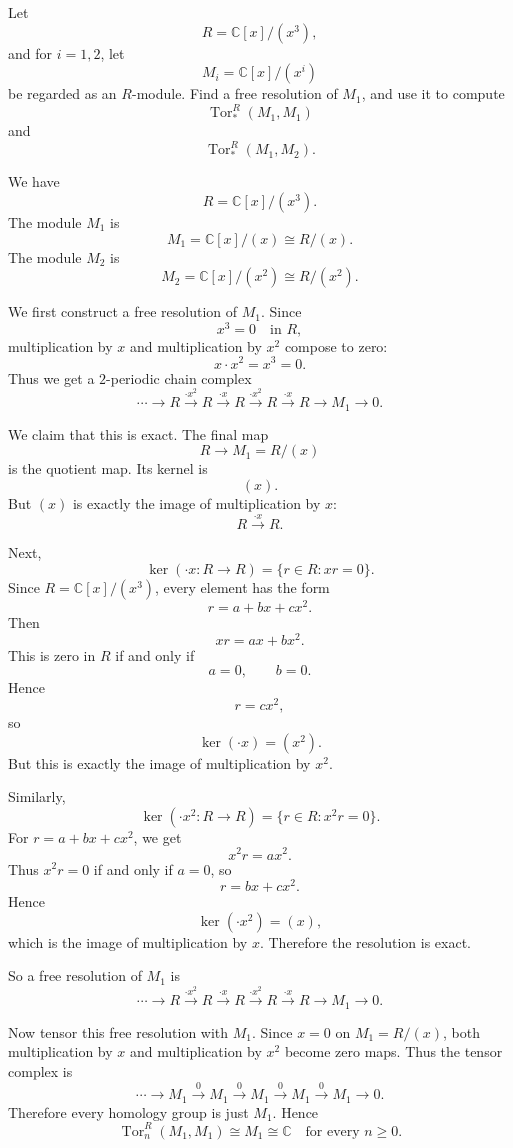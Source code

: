 \begin{problem}
Let
\[
R=\mathbb C[x]/(x^3),
\]
and for \(i=1,2\), let
\[
M_i=\mathbb C[x]/(x^i)
\]
be regarded as an \(R\)-module. Find a free resolution of \(M_1\), and use it to compute
\[
\operatorname{Tor}^R_*(M_1,M_1)
\]
and
\[
\operatorname{Tor}^R_*(M_1,M_2).
\]
\end{problem}

\begin{solution}
We have
\[
R=\mathbb C[x]/(x^3).
\]
The module \(M_1\) is
\[
M_1=\mathbb C[x]/(x)\cong R/(x).
\]
The module \(M_2\) is
\[
M_2=\mathbb C[x]/(x^2)\cong R/(x^2).
\]

We first construct a free resolution of \(M_1\). Since
\[
x^3=0 \quad \text{in } R,
\]
multiplication by \(x\) and multiplication by \(x^2\) compose to zero:
\[
x\cdot x^2=x^3=0.
\]
Thus we get a \(2\)-periodic chain complex
\[
\cdots
\longrightarrow
R
\xrightarrow{\cdot x^2}
R
\xrightarrow{\cdot x}
R
\xrightarrow{\cdot x^2}
R
\xrightarrow{\cdot x}
R
\longrightarrow
M_1
\longrightarrow
0.
\]

We claim that this is exact. The final map
\[
R\longrightarrow M_1=R/(x)
\]
is the quotient map. Its kernel is
\[
(x).
\]
But \((x)\) is exactly the image of multiplication by \(x\):
\[
R\xrightarrow{\cdot x} R.
\]

Next,
\[
\ker(\cdot x:R\to R)
=
\{r\in R: xr=0\}.
\]
Since \(R=\mathbb C[x]/(x^3)\), every element has the form
\[
r=a+bx+cx^2.
\]
Then
\[
xr=ax+bx^2.
\]
This is zero in \(R\) if and only if
\[
a=0,\qquad b=0.
\]
Hence
\[
r=cx^2,
\]
so
\[
\ker(\cdot x)=(x^2).
\]
But this is exactly the image of multiplication by \(x^2\).

Similarly,
\[
\ker(\cdot x^2:R\to R)
=
\{r\in R:x^2r=0\}.
\]
For \(r=a+bx+cx^2\), we get
\[
x^2r=ax^2.
\]
Thus \(x^2r=0\) if and only if \(a=0\), so
\[
r=bx+cx^2.
\]
Hence
\[
\ker(\cdot x^2)=(x),
\]
which is the image of multiplication by \(x\). Therefore the resolution is exact.

So a free resolution of \(M_1\) is
\[
\boxed{
	\cdots
	\longrightarrow
	R
	\xrightarrow{\cdot x^2}
	R
	\xrightarrow{\cdot x}
	R
	\xrightarrow{\cdot x^2}
	R
	\xrightarrow{\cdot x}
	R
	\longrightarrow
	M_1
	\longrightarrow
	0.
}
\]

Now tensor this free resolution with \(M_1\). Since \(x=0\) on \(M_1=R/(x)\), both multiplication by \(x\) and multiplication by \(x^2\) become zero maps. Thus the tensor complex is
\[
\cdots
\longrightarrow
M_1
\xrightarrow{0}
M_1
\xrightarrow{0}
M_1
\xrightarrow{0}
M_1
\xrightarrow{0}
M_1
\longrightarrow
0.
\]
Therefore every homology group is just \(M_1\). Hence
\[
\boxed{
	\operatorname{Tor}^R_n(M_1,M_1)\cong M_1
	\cong \mathbb C
	\quad \text{for every } n\geq 0.
}
\]


\end{solution}
